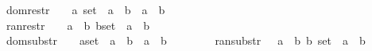 \begin{isabellebody}
dom{\isacharunderscore}restr\ \ \ \ {\isacharcolon}{\isacharcolon}{\isachardoublequoteopen}{\isacharbrackleft}{\isacharprime}a\ set\ {\isacharcomma}\ {\isacharprime}a\ {\isacharless}{\isacharequal}{\isachargreater}\ {\isacharprime}b{\isacharbrackright}\ {\isacharequal}{\isachargreater}\ {\isacharparenleft}{\isacharprime}a\ {\isacharless}{\isacharequal}{\isachargreater}\ {\isacharprime}b{\isacharparenright}{\isachardoublequoteclose}\ \ \ \ {\isacharparenleft}{\isachardoublequoteopen}{\isacharunderscore}\ {\isasymdres}\ {\isacharunderscore}{\isachardoublequoteclose}\ \ {\isacharbrackleft}{}{}{\isacharcomma}{}{}{\isacharbrackright}\ {}{}{\isacharparenright}\isanewline
ran{\isacharunderscore}restr\ \ \ \ {\isacharcolon}{\isacharcolon}{\isachardoublequoteopen}{\isacharbrackleft}{\isacharprime}a\ {\isacharless}{\isacharequal}{\isachargreater}\ {\isacharprime}b{\isacharcomma}\ {\isacharparenleft}{\isacharprime}b{\isacharparenright}set{\isacharbrackright}\ {\isacharequal}{\isachargreater}\ {\isacharprime}a\ {\isacharless}{\isacharequal}{\isachargreater}\ {\isacharprime}b{\isachardoublequoteclose}\ \ \ \ \ \ {\isacharparenleft}{\isachardoublequoteopen}{\isacharunderscore}\ {\isasymrres}\ {\isacharunderscore}{\isachardoublequoteclose}\ \ {\isacharbrackleft}{}{}{\isacharcomma}{}{}{\isacharbrackright}\ {}{}{\isacharparenright}\isanewline
dom{\isacharunderscore}substr\ \ \ {\isacharcolon}{\isacharcolon}{\isachardoublequoteopen}{\isacharbrackleft}\ {\isacharparenleft}{\isacharprime}a{\isacharparenright}set\ {\isacharcomma}\ {\isacharprime}a\ {\isacharless}{\isacharequal}{\isachargreater}\ {\isacharprime}b{\isacharbrackright}\ {\isacharequal}{\isachargreater}\ {\isacharprime}a\ {\isacharless}{\isacharequal}{\isachargreater}\ {\isacharprime}b{\isachardoublequoteclose}\ \ \ \ {\isacharparenleft}{\isachardoublequoteopen}{\isacharunderscore}\ {\isasymndres}\ {\isacharunderscore}{\isachardoublequoteclose}\ {\isacharbrackleft}{}{}{\isacharcomma}{}{}{\isacharbrackright}\ {}{}{\isacharparenright}\isanewline
ran{\isacharunderscore}substr\ \ \ {\isacharcolon}{\isacharcolon}{\isachardoublequoteopen}{\isacharbrackleft}{\isacharprime}a\ {\isacharless}{\isacharequal}{\isachargreater}\ {\isacharprime}b{\isacharcomma}\ {\isacharparenleft}{\isacharprime}b{\isacharparenright}\ set{\isacharbrackright}\ {\isacharequal}{\isachargreater}\ {\isacharparenleft}{\isacharprime}a\ {\isacharless}{\isacharequal}{\isachargreater}\ {\isacharprime}b{\isacharparenright}{\isachardoublequoteclose}\ \ \ {\isacharparenleft}{\isachardoublequoteopen}{\isacharunderscore}\ {\isasymnrres}\ {\isacharunderscore}{\isachardoublequoteclose}\ {\isacharbrackleft}{}{}{\isacharcomma}{}{}{\isacharbrackright}\ {}{}{\isacharparenright}\isanewline

\end{isabellebody}
